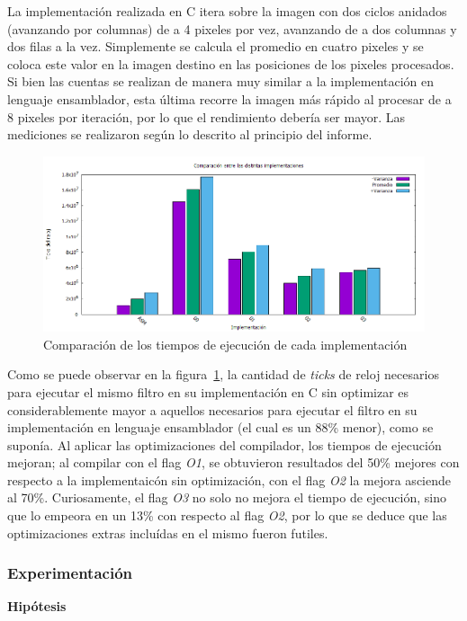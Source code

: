 \documentclass[a4paper]{article}
\begin{document}
La implementación realizada en C itera sobre la imagen con dos ciclos anidados (avanzando por columnas) de a 4 pixeles por vez, avanzando de a dos columnas y dos filas a la vez. Simplemente se calcula el promedio en cuatro pixeles y se coloca este valor en la imagen destino en las posiciones de los pixeles procesados. Si bien las cuentas se realizan de manera muy similar a la implementación en lenguaje ensamblador, esta última recorre la imagen más rápido al procesar de a 8 pixeles por iteración, por lo que el rendimiento debería ser mayor. Las mediciones se realizaron según lo descrito al principio del informe.
\\
\begin{figure}[H]
  \begin{center}
	\includegraphics[scale=0.66]{imagenes/pixelarC.png}
	\caption{Comparación de los tiempos de ejecución de cada implementación}
	\label{pixelar_asmvsc}
  \end{center}
\end{figure}

Como se puede observar en la figura~\ref{pixelar_asmvsc}, la cantidad de \textit{ticks} de reloj necesarios para ejecutar el mismo filtro en su implementación en C sin optimizar es considerablemente mayor a aquellos necesarios para ejecutar el filtro en su implementación en lenguaje ensamblador (el cual es un 88\% menor), como se suponía. Al aplicar las optimizaciones del compilador, los tiempos de ejecución mejoran; al compilar con el flag \textit{O1}, se obtuvieron resultados del 50\% mejores con respecto a la implementaicón sin optimización, con el flag \textit{O2} la mejora asciende al 70\%. Curiosamente, el flag \textit{O3} no solo no mejora el tiempo de ejecución, sino que lo empeora en un 13\% con respecto al flag \textit{O2}, por lo que se deduce que las optimizaciones extras incluídas en el mismo fueron futiles.

\subsubsection{Experimentación}
\textbf{Hipótesis}
\end{document}
